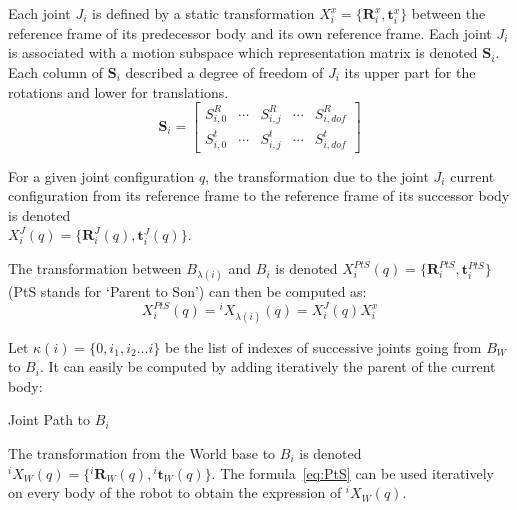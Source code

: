 Each joint $J_i$ is defined by a static transformation $X^x_i = \{\mathbf{R}^x_i, \mathbf{t}^x_i\}$ between the reference frame of its predecessor body and its own reference frame.
Each joint $J_i$ is associated with a motion subspace which representation matrix is denoted $\mathbf{S}_i$. Each column of $\mathbf{S}_i$ described a degree of freedom of $J_i$ its upper part for the rotations and lower for translations.
\begin{equation}
  \mathbf{S}_i =
  \begin{bmatrix}
    S^R_{i,0} & \cdots &
    S^R_{i,j} & \cdots &
    S^R_{i,dof} \\
    S^t_{i,0} & \cdots &
    S^t_{i,j} & \cdots &
    S^t_{i,dof}
  \end{bmatrix}
\end{equation}

For a given joint configuration $q$, the transformation due to the joint $J_i$ current configuration from its reference frame to the reference frame of its successor body is denoted \\$X^J_i (q) = \{\mathbf{R}^J_i (q), \mathbf{t}^J_i (q)\}$.

The transformation between $B_{\lambda(i)}$ and $B_i$ is denoted $X^{PtS}_i (q) = \{\mathbf{R}^{PtS}_i, \mathbf{t}^{PtS}_i\}$ (PtS stands for `Parent to Son') can then be computed as:
\begin{equation}
  {X}^{PtS}_i (q) = {}^{i}X_{\lambda (i)} (q) = X^J_i (q) X^x_i
  \label{eq:PtS}
\end{equation}

Let $\kappa (i) =\{0, i_1, i_2 \ldots i\}$ be the list of indexes of successive joints going from $B_W$ to $B_i$.
It can easily be computed by adding iteratively the parent of the current body:

\begin{algorithm}
  \caption{Joint Path to $B_i$}
\label{alg:JP}
\begin{algorithmic}
  \EndWhile{}
\end{algorithmic}
\end{algorithm}

The transformation from the World base to $B_i$ is denoted \\ ${}^i X_W (q) = \{{}^i \mathbf{R}_W (q), {}^i \mathbf{t}_W (q)\}$.
The formula~\ref{eq:PtS} can be used iteratively on every body of the robot to obtain the expression of ${}^i X_W (q)$.

